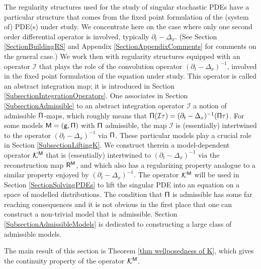 \documentclass[10pt, reqno]{amsart}
\numberwithin{subsection}{section}
\numberwithin{subsubsection}{subsection}
\numberwithin{equation}{section} %
\theoremstyle{mystyle}
\theoremstyle{mystyle2}
\theoremstyle{mystyle3}
\newcommand{\mcI}{\mathcal{I}}
\newcommand{\mcK}{\mathcal{K}}
\begin{document}
The regularity structures used for the study of singular stochastic PDEs have a particular structure that comes from the fixed point formulation of the (system of) PDE(s) under study. We concentrate here on the case where only one second order differential operator is involved, typically $\partial_t-\Delta_x$. (See Section \ref{SectionBuildingRS} and  Appendix {\sf \ref{SectionAppendixComments}} for comments on the general case.) We work then with regularity structures equipped with an operator $\mcI$ that plays the role of the convolution operator $(\partial_t-\Delta_x)^{-1}$, involved in the fixed point formulation of the equation under study. This operator is called an abstract integration map; it is introduced in Section \ref{SubsectionIntegrationOperators}. One associates in Section \ref{SubsectionAdmissible} to an abstract integration operator $\mcI$ a notion of admissible $\sf\Pi$-maps, which roughly means that ${\sf \Pi}(\mcI\tau) = (\partial_t-\Delta_x)^{-1}({\sf \Pi}\tau)$. For some models $\sf M=(g, \Pi)$ with $\sf \Pi$ admissible, the map $\mcI$ is (essentially) intertwined to the operator $(\partial_t-\Delta_x)^{-1}$ via $\sf \Pi$. These particular models play a crucial role in Section \ref{SubsectionLiftingK}. We construct therein a model-dependent operator $\mcK^{\sf M}$ that is (essentially) intertwined to $(\partial_t-\Delta_x)^{-1}$ via the reconstruction map ${\sf R}^{\sf M}$, and which also has a regularizing property analogue to a similar property enjoyed by $(\partial_t-\Delta_x)^{-1}$. The operator $\mcK^{\sf M}$ will be used in Section \ref{SectionSolvingPDEs} to lift the singular PDE into an equation on a space of modelled distributions. The condition that $\sf \Pi$ is admissible has some far reaching consequences and it is not obvious in the first place that one can construct a non-trivial model that is admissible. Section \ref{SubsectionAdmissibleModels} is dedicated to constructing a large class of admissible models. 

The main result of this section is Theorem \ref{thm wellposedness of K}, which gives the continuity property of the operator $\mcK^{\sf M}$. 

\medskip
\end{document}
